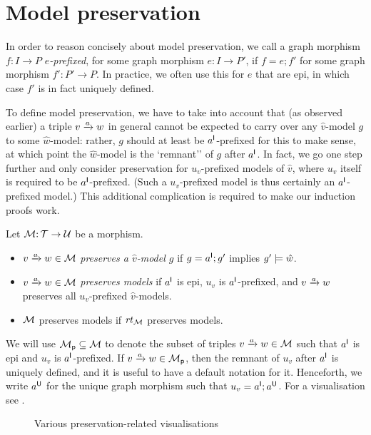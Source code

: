 \section{Model preservation}
\label{sec:preservation}

In order to reason concisely about model preservation, we call a graph morphism $f:I\to P$ \emph{$e$-prefixed}, for some graph morphism $e:I\to P'$, if $f=e;f'$ for some graph morphism $f':P'\to P$. In practice, we often use this for $e$ that are epi, in which case $f'$ is in fact uniquely defined.

To define model preservation, we have to take into account that (as observed earlier) a triple $\trip vaw$ in general cannot be expected to carry over any $\hat v$-model $g$ to some $\hat w$-model: rather, $g$ should at least be $a^{\mathsf I}$-prefixed for this to make sense, at which point the $\hat w$-model is the `remnant'' of $g$ after $a^{\mathsf I}$. In fact, we go one step further and only consider preservation for $u_v$-prefixed models of $\hat v$, where $u_v$ itself is required to be $a^{\mathsf I}$-prefixed. (Such a $u_v$-prefixed model is thus certainly an $a^{\mathsf I}$-prefixed model.) This additional complication is required to make our induction proofs work.
%
\begin{definition}
Let ${\mathcal{M}}{:}\, {\mathcal{T}}\rightarrow{\mathcal{U}}$ be a morphism.
\begin{itemize}[topsep=\smallskipamount]
\item $\trip vaw\in \cM$ \emph{preserves a $\hat v$-model $g$} if $g=a^{\mathsf I};g'$ implies $g'\models \hat w$.

\item $\trip vaw\in \cM$ \emph{preserves models} if $a^{\mathsf I}$ is epi, $u_v$ is $a^{\mathsf I}$-prefixed, and $\trip vaw$ preserves all $u_v$-prefixed $\hat v$-models. 

\item ${\mathcal{M}}$ preserves models if $\mathit{rt}_{{\mathcal{M}}}$ preserves models.
\end{itemize}
\end{definition}
%
We will use ${\mathcal{M}}_{\mathsf{p}}\subseteq {\mathcal{M}}$ to denote the subset of triples $\trip vaw\in\cM$ such that $a^{\mathsf I}$ is epi and $u_v$ is $a^{\mathsf I}$-prefixed. If $\trip vaw\in \cM_\pgen$, then the remnant of $u_v$ after $a^{\mathsf I}$ is uniquely defined, and it is useful to have a default notation for it. Henceforth, we write $a^{\mathsf U}$ for the unique graph morphism such that $u_v=a^{\mathsf I};a^{\mathsf U}$. For a visualisation see .
%
\begin{figure}
	
	\caption{Various preservation-related visualisations}
	\label{fig:fusion}
\end{figure}

